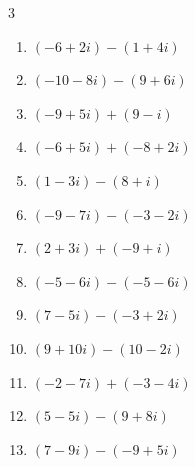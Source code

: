 \begin{multicols}{3}
\begin{enumerate}
  \item $\displaystyle (-6+2i) - (1+4i)$

        \phantom{$\displaystyle =-7-2i$}

  \item $\displaystyle (-10-8i) - (9+6i)$

        \phantom{$\displaystyle =-19-14i$}

  \item $\displaystyle (-9+5i) + (9-i)$

        \phantom{$\displaystyle =4i$}

  \item $\displaystyle (-6+5i) + (-8+2i)$

        \phantom{$\displaystyle =-14+7i$}

  \item $\displaystyle (1-3i) - (8+i)$

        \phantom{$\displaystyle =-7-4i$}

  \item $\displaystyle (-9-7i) - (-3-2i)$

        \phantom{$\displaystyle =-6-5i$}

  \item $\displaystyle (2+3i) + (-9+i)$

        \phantom{$\displaystyle =-7+4i$}

  \item $\displaystyle (-5-6i) - (-5-6i)$

        \phantom{$\displaystyle =0$}

  \item $\displaystyle (7-5i) - (-3+2i)$

        \phantom{$\displaystyle =10-7i$}

  \item $\displaystyle (9+10i) - (10-2i)$

        \phantom{$\displaystyle =-1+12i$}

  \item $\displaystyle (-2-7i) + (-3-4i)$

        \phantom{$\displaystyle =-5-11i$}

  \item $\displaystyle (5-5i) - (9+8i)$

        \phantom{$\displaystyle =-4-13i$}

\columnbreak %

  \item $\displaystyle (7-9i) - (-9+5i)$


\end{enumerate}
\end{multicols}
